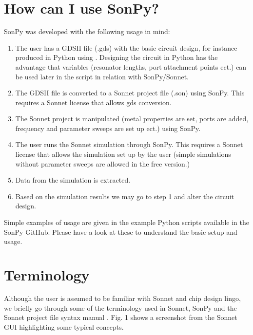 \documentclass[letterpaper,10pt,english,openany]{sphinxmanual}
\begin{document}
\section{How can I use SonPy?}
\label{\detokenize{source/users_guide:how-can-i-use-sonpy}}
SonPy was developed with the following usage in mind:
\begin{enumerate}
\item {} 
The user has a GDSII file (.gds) with the basic circuit design, for instance produced in Python using . Designing the circuit in Python has the advantage that variables (resonator lengths, port attachment points ect.) can be used later in the script in relation with SonPy/Sonnet.

\item {} 
The GDSII file is converted to a Sonnet project file (.son) using SonPy. This requires a Sonnet license that allows gds conversion.

\item {} 
The Sonnet project is manipulated (metal properties are set, ports are added, frequency and parameter sweeps are set up ect.) using SonPy.

\item {} 
The user runs the Sonnet simulation through SonPy. This requires a Sonnet license that allows the simulation set up by the user (simple simulations without parameter sweeps are allowed in the free version.)

\item {} 
Data from the simulation is extracted.

\item {} 
Based on the simulation results we may go to step 1 and alter the circuit design.

\end{enumerate}

Simple examples of usage are given in the example Python scripts available in the SonPy GitHub. Please have a look at these to understand the basic setup and usage.


\section{Terminology}
\label{\detokenize{source/users_guide:terminology}}
Although the user is assumed to be familiar with Sonnet and chip design lingo, we briefly go through some of the terminology used in Sonnet, SonPy and the Sonnet project file syntax manual \label{\detokenize{source/users_guide:id1}}{\hyperref[\detokenize{source/users_guide:son15}]{\sphinxcrossref{{[}Son15{]}}}}. Fig. 1 shows a screenshot from the Sonnet GUI highlighting some typical concepts.
\end{document}
